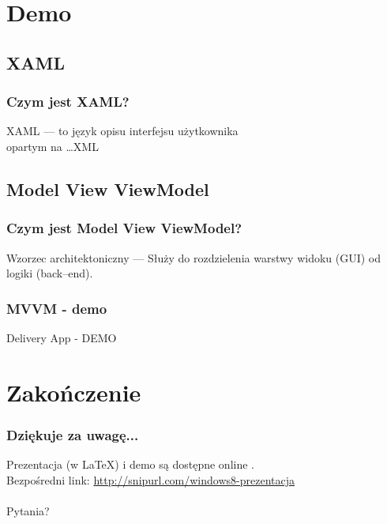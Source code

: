 \documentclass{beamer}
\begin{document}
\section{Demo}
\subsection{XAML}
\begin{frame}
\frametitle{Czym jest XAML?}
XAML --- to język opisu interfejsu użytkownika\\ opartym na \ldots XML
\end{frame}


\subsection{Model View ViewModel}
\begin{frame}
\frametitle{Czym jest Model View ViewModel?}
Wzorzec architektoniczny --- Służy do rozdzielenia warstwy widoku (GUI) od logiki (back--end). \\ 
\end{frame}

\begin{frame}
\frametitle{MVVM - demo}
\begin{Huge}
Delivery App - DEMO
\end{Huge}
\end{frame}


\section{Zakończenie}
\begin{frame}
\frametitle{Dziękuje za uwagę...}
Prezentacja (w \LaTeX) i demo są dostępne online \href{http://github.com/soltys}{}. \\
Bezpośredni link: \href{http://snipurl.com/windows8-prezentacja}{http://snipurl.com/windows8-prezentacja}\\
\\
Pytania?

\end{frame}
\end{document}
